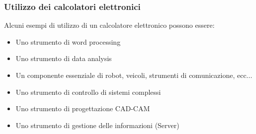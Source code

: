 \documentclass{article}
\begin{document}
	\subsubsection{Utilizzo dei calcolatori elettronici}
	Alcuni esempi di utilizzo di un calcolatore elettronico possono essere:
	\begin{itemize}
		\item Uno strumento di word processing
		\item Uno strumento di data analysis
		\item Un componente essenziale di robot, veicoli, strumenti di comunicazione, ecc...
		\item Uno strumento di controllo di sistemi complessi
		\item Uno strumento di progettazione CAD-CAM
		\item Uno strumento di gestione delle informazioni (Server)
	\end{itemize}
	\newpage
\end{document}
